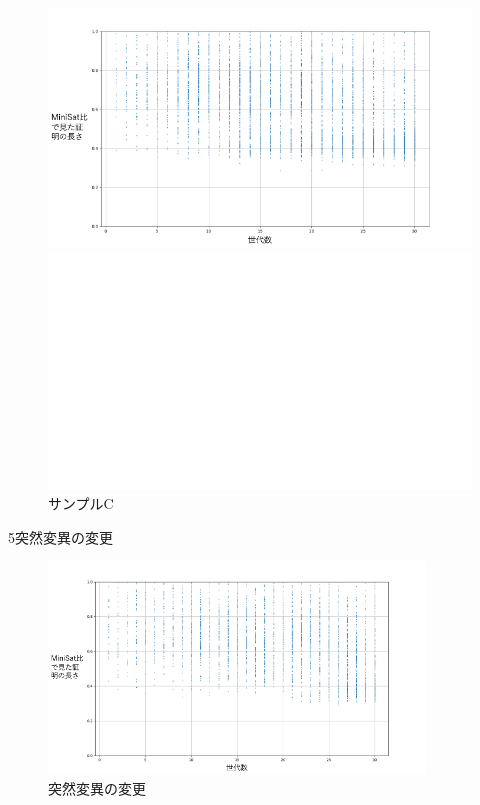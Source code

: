 \begin{figure}[h]
    \begin{minipage}{0.43\columnwidth}
        \centering
        \includegraphics[width=\columnwidth]{figures/Experiment1/4-3.png}
        \caption{サンプルC}
        \label{fig:サンプルC}
    \end{minipage}
    \hspace{5mm}
    \begin{minipage}{0.43\columnwidth}
        \centering
        \includegraphics[width=\columnwidth]{figures/white.png}
    \end{minipage}
\end{figure}

5突然変異の変更
\begin{figure}[h]
    \centering
    \includegraphics[width=10cm]{figures/Experiment1/5.png}
    \caption{突然変異の変更}
\end{figure}


